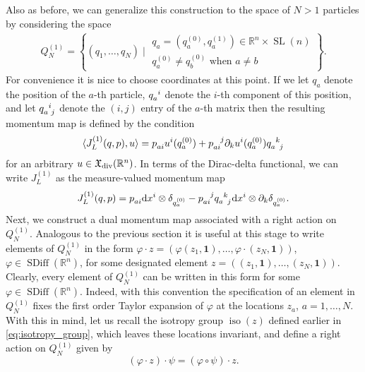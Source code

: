 \documentclass[12pt]{amsart}
\newcommand{\R}{\ensuremath{\mathbb{R}}}
\newcommand{\dx}{\ensuremath{\textrm{d}x}}
\DeclareMathOperator{\SDiff}{SDiff}
\DeclareMathOperator{\SL}{SL}
\DeclareMathOperator{\iso}{iso}
\begin{document}
  Also as before, we can generalize this construction to the space of
  $N > 1$ particles by considering the space
  \begin{align*}
    Q^{(1)}_N = \left\{  ( q_1 , \dots, q_N ) \mid
      \begin{array}{c}
        q_a = (q^{(0)}_a,q^{(1)}_a) \in \R^n \times \SL(n) \\
        q^{(0)}_a \neq q^{(0)}_b \text{ when } a \neq b
      \end{array} \right\}.
  \end{align*}
  For convenience it is nice to choose coordinates at this point.
  If we let $q_a$ denote the position of the $a$-th particle,
  $q\indices{_a^i}$ denote the $i$-th component of this position,
  and let $q\indices{_a^i_j}$ denote the $(i,j)$ entry of the $a$-th
  matrix then the resulting momentum map is defined by the condition
  \begin{align*}
    \langle J_L^{(1)}(q,p) , u \rangle
    = p\indices{_a_i} u^i(q^{(0)}_a) + p\indices{_a_i^j} \partial_k u^i(q^{(0)}_a) q\indices{_a^k_j}
  \end{align*}
  for an arbitrary $u \in \mathfrak{X}_{\rm div}(\R^n)$.
  In terms of the Dirac-delta functional, we can write $J_L^{(1)}$ as the measure-valued momentum map
  \begin{align*}
    J_L^{(1)}(q, p)
    = p\indices{_a_i} \dx^i \otimes \delta_{q_a^{(0)}}
     -p\indices{_a_i^j} q\indices{_a^k_j} \dx^i \otimes \partial_k \delta_{q_a^{(0)}}.
  \end{align*}
  Next, we construct a dual momentum map associated with a right action on $Q_N^{(1)}$. Analogous to the previous section  it is useful at this stage to write elements of $Q_N^{(1)}$ in the form $ \varphi \cdot z = (\varphi (z_1, {\mathbf{1}}), \ldots, \varphi \cdot (z_N , \mathbf{1}))$, $\varphi \in \SDiff(\mathbb{R}^n)$, for some designated element $ z=( (z_1, \mathbf{1}), \ldots, (z_N, \mathbf{1}))$. Clearly, every element of $Q_N^{(1)}$ can be written in this form for some  $\varphi \in \SDiff(\mathbb{R}^n)$. Indeed, with this convention the specification of an element in $Q_N^{(1)}$ fixes the first order Taylor expansion of $\varphi$ at the locations $z_a$, $a = 1, \ldots, N$. With this in mind, let us recall the isotropy group $\iso(z)$ defined earlier in \eqref{eq:isotropy_group}, which leaves these locations invariant, and define a right action on  $Q_N^{(1)}$ given by 
\begin{equation*}
	 (\varphi \cdot z) \cdot \psi  = (\varphi \circ \psi) \cdot z.
\end{equation*}
\end{document}
